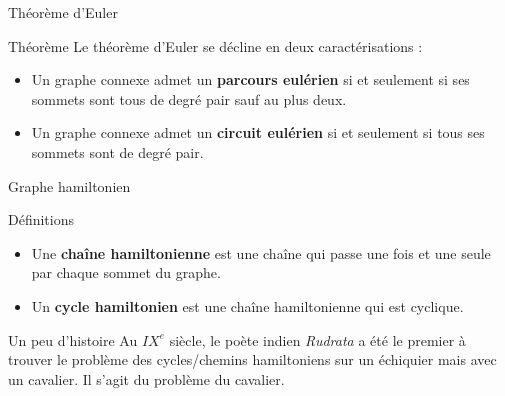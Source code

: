 \documentclass[10pt,xcolor=dvipsnames]{beamer}
\newcommand{\defin}[1]{\textcolor{darkspringgreen}{#1}}
\begin{document}
\begin{frame}{Théorème d'Euler}
    \begin{exampleblock}{Théorème}
    Le théorème d'Euler se décline en deux caractérisations :
\begin{itemize}
    \item  Un graphe \defin{connexe} admet un \defin{\textbf{parcours eulérien}} si et seulement si ses sommets sont tous de degré \defin{pair} sauf au plus deux.
    \item  Un graphe \defin{connexe} admet un \textbf{circuit eulérien} si et seulement si tous ses sommets sont de degré \defin{pair}.
\end{itemize}
    \end{exampleblock}
\end{frame}

\begin{frame}{Graphe hamiltonien}
    \begin{exampleblock}{Définitions}
    \begin{itemize}
        \item Une \defin{\textbf{chaîne hamiltonienne}} est une chaîne qui passe une fois et une seule par chaque sommet du graphe.
        \item Un \defin{\textbf{cycle hamiltonien}} est une chaîne \defin{hamiltonienne} qui est cyclique.
    \end{itemize}
    \begin{alertblock}{Un peu d'histoire}
    Au $IX^e$ siècle, le poète indien \textit{Rudrata} a été le premier à trouver le problème des cycles/chemins \alert{hamiltoniens} sur un échiquier mais avec un cavalier. Il s'agit du \alert{problème du cavalier}. 
    \end{alertblock}
    \end{exampleblock}
\end{frame}
\end{document}
